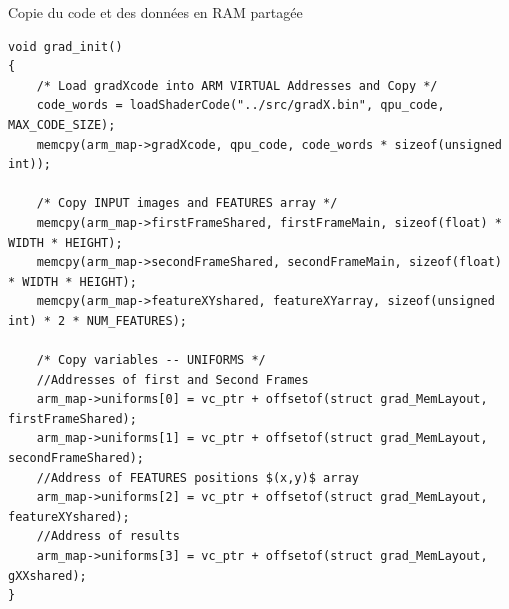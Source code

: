 \documentclass{bredelebeamer}
\begin{document}

\begin{frame}[fragile]{Copie du code et des données en RAM partagée}

\begin{lstlisting}
void grad_init()
{
    /* Load gradXcode into ARM VIRTUAL Addresses and Copy */
    code_words = loadShaderCode("../src/gradX.bin", qpu_code, MAX_CODE_SIZE);
    memcpy(arm_map->gradXcode, qpu_code, code_words * sizeof(unsigned int));

    /* Copy INPUT images and FEATURES array */
    memcpy(arm_map->firstFrameShared, firstFrameMain, sizeof(float) * WIDTH * HEIGHT);
    memcpy(arm_map->secondFrameShared, secondFrameMain, sizeof(float) * WIDTH * HEIGHT);
    memcpy(arm_map->featureXYshared, featureXYarray, sizeof(unsigned int) * 2 * NUM_FEATURES);

    /* Copy variables -- UNIFORMS */
    //Addresses of first and Second Frames
    arm_map->uniforms[0] = vc_ptr + offsetof(struct grad_MemLayout, firstFrameShared);
    arm_map->uniforms[1] = vc_ptr + offsetof(struct grad_MemLayout, secondFrameShared);
    //Address of FEATURES positions $(x,y)$ array
    arm_map->uniforms[2] = vc_ptr + offsetof(struct grad_MemLayout, featureXYshared);
    //Address of results
    arm_map->uniforms[3] = vc_ptr + offsetof(struct grad_MemLayout, gXXshared);
}
\end{lstlisting}

\end{frame}

\end{document}
